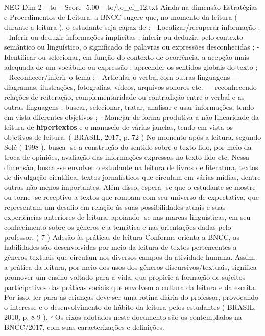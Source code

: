 \begin{textsample}{NEG Dim 2 – to – Score -5.00 – to/to\_ef\_12.txt}
Ainda na dimensão Estratégias e Procedimentos de Leitura, a BNCC sugere que, no momento da leitura ( durante a leitura ), o estudante seja capaz de : - Localizar/recuperar informação ; - Inferir ou deduzir informações implícitas ; inferir ou deduzir, pelo contexto semântico ou linguístico, o significado de palavras ou expressões desconhecidas ; - Identificar ou selecionar, em função do contexto de ocorrência, a acepção mais adequada de um vocábulo ou expressão ; apreender os sentidos globais do texto ; - Reconhecer/inferir o tema ; - Articular o verbal com outras linguagens — diagramas, ilustrações, fotografias, vídeos, arquivos sonoros etc. — reconhecendo relações de reiteração, complementaridade ou contradição entre o verbal e as outras linguagens ; buscar, selecionar, tratar, analisar e usar informações, tendo em vista diferentes objetivos ; - Manejar de forma produtiva a não linearidade da leitura de \textbf{hipertextos} e o manuseio de várias janelas, tendo em vista os objetivos de leitura. ( BRASIL, 2017, p. 72 ) No momento após a leitura, segundo Solé ( 1998 ), busca -se a construção do sentido sobre o texto lido, por meio da troca de opiniões, avaliação das informações expressas no texto lido etc.
Nessa dimensão, busca -se envolver o estudante na leitura de livros de literatura, textos de divulgação científica, textos jornalísticos que circulam em várias mídias, dentre outras não menos importantes.
Além disso, espera -se que o estudante se mostre ou torne -se receptivo a textos que rompam com seu universo de expectativa, que representam um desafio em relação às suas possibilidades atuais e suas experiências anteriores de leitura, apoiando -se nas marcas linguísticas, em seu conhecimento sobre os gêneros e a temática e nas orientações dadas pelo professor. ( 7 ) Adesão às práticas de leitura Conforme orienta a BNCC, as habilidades são desenvolvidas por meio da leitura de textos pertencentes a gêneros textuais que circulam nos diversos campos da atividade humana.
Assim, a prática da leitura, por meio dos usos dos gêneros discursivos/textuais, significa promover um ensino voltado para a vida, que propicie a formação de sujeitos participativos das práticas sociais que envolvem a cultura da leitura e da escrita.
Por isso, ler para as crianças deve ser uma rotina diária do professor, provocando o interesse e o desenvolvimento do hábito da leitura pelos estudantes ( BRASIL, 2010, p. 8-9 ). ⁶ Os eixos adotados neste documento são os contemplados na BNCC/2017, com suas caracterizações e definições.

\end{textsample}
